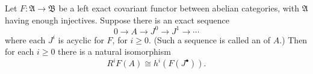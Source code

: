 Let $F: \mathfrak{A} \to \mathfrak{B}$ be a left exact covariant functor between abelian categories, with $\mathfrak{A}$ having enough injectives. Suppose there is an exact sequence
$$0 \to A \to J^0 \to J^1 \to \cdots$$
where each $J^i$ is acyclic for $F$, for $i \geqslant 0$. (Such a sequence is called an  of $A$.) Then for each $i \geqslant 0$ there is a natural isomorphism
$$R^i F(A) \cong h^i(F(J^\bullet)).$$
